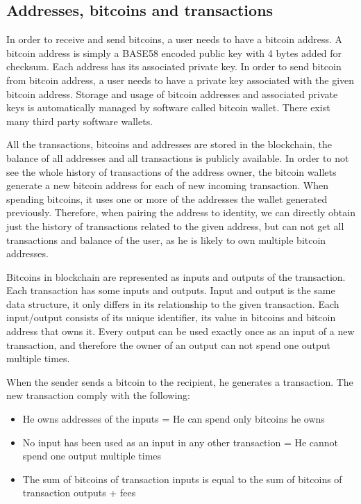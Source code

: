 \documentclass[
  digital, %
  table,   %
  lof,     %
  lot,     %
  oneside
]{fithesis3}
\begin{document}
\subsection{Addresses, bitcoins and transactions}
In order to receive and send bitcoins, a user needs to have a bitcoin address.
A bitcoin address is simply a BASE58 encoded public key with 4 bytes added for checksum.
Each address has its associated private key.
In order to send bitcoin from bitcoin address, a user needs to have a private key associated with the given bitcoin address.
Storage and usage of bitcoin addresses and associated private keys is automatically managed
by software called bitcoin wallet. There exist many third party software wallets.

All the transactions, bitcoins and addresses are stored in the blockchain,
the balance of all addresses and all transactions is publicly available.
In order to not see the whole history of transactions of the address owner,
the bitcoin wallets generate a new bitcoin address for each of new incoming transaction. When spending bitcoins, it uses one or more of the addresses the wallet generated previously.
Therefore, when pairing the address to identity, we can directly obtain just the history of transactions related to the given
address, but can not get all transactions and balance of the user, as he is likely to own multiple bitcoin addresses.

Bitcoins in blockchain are represented as inputs and outputs of the transaction.
Each transaction has some inputs and outputs. 
Input and output is the same data structure, it only differs in its relationship to the given transaction.
Each input/output consists of its unique identifier, its value in bitcoins and bitcoin address that owns it.
Every output can be used exactly once as an input of a new transaction, and therefore the owner of an output can not
spend one output multiple times.

When the sender sends a bitcoin to the recipient, he generates a transaction.
The new transaction comply with the following:
\begin{itemize}
  \item He owns addresses of the inputs = He can spend only bitcoins he owns
  \item No input has been used as an input in any other transaction = He cannot spend one output multiple times
  \item The sum of bitcoins of transaction inputs is equal to the sum of bitcoins of transaction outputs + fees
\end{itemize}
\end{document}
